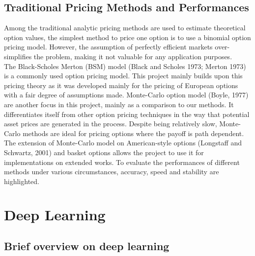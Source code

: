 \documentclass{report}
\begin{document}
\subsection{Traditional Pricing Methods and Performances}
Among the traditional analytic pricing methods are used to estimate theoretical option values, the simplest method to price one option is to use a binomial option pricing model. However, the assumption of perfectly efficient markets over-simplifies the problem, making it not valuable for any application purposes. \\
The Black-Scholes Merton (BSM) model (Black and Scholes 1973; Merton 1973) is a commonly used option pricing model. This project mainly builds upon this pricing theory as it was developed mainly for the pricing of European options  with a fair degree of assumptions made. Monte-Carlo option model (Boyle, 1977) are another focus in this project, mainly as a comparison to our methods. It differentiates itself from other option pricing techniques in the way that potential asset prices are generated in the process. Despite being relatively slow, Monte-Carlo methods are ideal for pricing options where the payoff is path dependent. The extension of Monte-Carlo model on American-style options (Longstaff and Schwartz, 2001) and basket options allows the project to use it for implementations on extended works. To evaluate the performances of different methods under various circumstances, accuracy, speed and stability are highlighted. 

\section{Deep Learning}

\subsection{Brief overview on deep learning}
\end{document}
